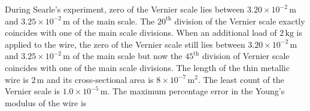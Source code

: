 

    \item During Searle's experiment, zero of the Vernier scale lies between $3.20 \times 10^{-2}\, \mathrm{m}$ and $3.25 \times 10^{-2}\, \mathrm{m}$ of the main scale. The $20^\text{th}$ division of the Vernier scale exactly coincides with one of the main scale divisions. When an additional load of $2\, \mathrm{kg}$ is applied to the wire, the zero of the Vernier scale still lies between $3.20 \times 10^{-2}\, \mathrm{m}$ and $3.25 \times 10^{-2}\, \mathrm{m}$ of the main scale but now the $45^\text{th}$ division of Vernier scale coincides with one of the main scale divisions. The length of the thin metallic wire is $2\, \mathrm{m}$ and its cross-sectional area is $8 \times 10^{-7}\, \mathrm{m}^2$. The least count of the Vernier scale is $1.0 \times 10^{-5}\, \mathrm{m}$. The maximum percentage error in the Young's modulus of the wire is \underline{\hspace{2.5 cm}}


